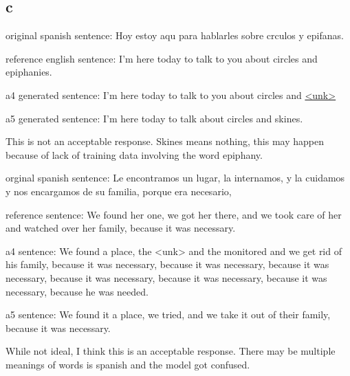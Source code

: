 \documentclass{article}
\begin{document}
\subsection*{c}
original spanish sentence: Hoy estoy aqu para hablarles sobre crculos y epifanas.

reference english sentence: I'm here today to talk to you  about circles and epiphanies.

a4 generated sentence: I'm here today to talk to you about circles and \underline{<unk>}

a5 generated sentence: I'm here today to talk about circles and skines.

This is not an acceptable response. Skines means nothing, this may happen because of lack of training data involving the word epiphany.

orginal spanish sentence: Le encontramos un lugar, la internamos, y la cuidamos y nos encargamos de su familia, porque era necesario,

reference sentence: We found her one, we got her there,  and we took care of her  and watched over her family,  because it was necessary.

a4 sentence: We found a place, the <unk> and the monitored and we get rid of his family, because it was necessary, because it was necessary, because it was necessary, because it was necessary, because it was necessary, because it was necessary, because he was needed.

a5 sentence: We found it a place, we tried, and we take it out of their family, because it was necessary.

While not ideal, I think this is an acceptable response. There may be multiple meanings of words is spanish and the model got confused.
\end{document}

